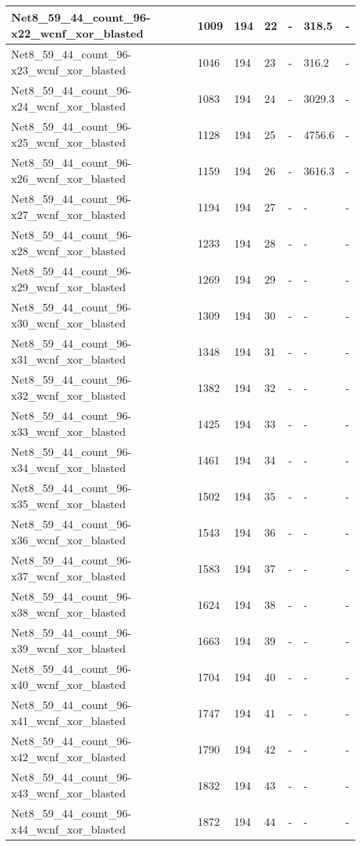 \begin{scriptsize}
\begin{longtable}{|p{5cm}|l|l|l|l|l|l|}
Net8\_59\_44\_count\_96-x22\_wcnf\_xor\_blasted&1009&194&22&-&318.5&- \\ \hline 
Net8\_59\_44\_count\_96-x23\_wcnf\_xor\_blasted&1046&194&23&-&316.2&- \\ \hline 
Net8\_59\_44\_count\_96-x24\_wcnf\_xor\_blasted&1083&194&24&-&3029.3&- \\ \hline 
Net8\_59\_44\_count\_96-x25\_wcnf\_xor\_blasted&1128&194&25&-&4756.6&- \\ \hline 
Net8\_59\_44\_count\_96-x26\_wcnf\_xor\_blasted&1159&194&26&-&3616.3&- \\ \hline 
Net8\_59\_44\_count\_96-x27\_wcnf\_xor\_blasted&1194&194&27&-&-&- \\ \hline 
Net8\_59\_44\_count\_96-x28\_wcnf\_xor\_blasted&1233&194&28&-&-&- \\ \hline 
Net8\_59\_44\_count\_96-x29\_wcnf\_xor\_blasted&1269&194&29&-&-&- \\ \hline 
Net8\_59\_44\_count\_96-x30\_wcnf\_xor\_blasted&1309&194&30&-&-&- \\ \hline 
Net8\_59\_44\_count\_96-x31\_wcnf\_xor\_blasted&1348&194&31&-&-&- \\ \hline 
Net8\_59\_44\_count\_96-x32\_wcnf\_xor\_blasted&1382&194&32&-&-&- \\ \hline 
Net8\_59\_44\_count\_96-x33\_wcnf\_xor\_blasted&1425&194&33&-&-&- \\ \hline 
Net8\_59\_44\_count\_96-x34\_wcnf\_xor\_blasted&1461&194&34&-&-&- \\ \hline 
Net8\_59\_44\_count\_96-x35\_wcnf\_xor\_blasted&1502&194&35&-&-&- \\ \hline 
Net8\_59\_44\_count\_96-x36\_wcnf\_xor\_blasted&1543&194&36&-&-&- \\ \hline 
Net8\_59\_44\_count\_96-x37\_wcnf\_xor\_blasted&1583&194&37&-&-&- \\ \hline 
Net8\_59\_44\_count\_96-x38\_wcnf\_xor\_blasted&1624&194&38&-&-&- \\ \hline 
Net8\_59\_44\_count\_96-x39\_wcnf\_xor\_blasted&1663&194&39&-&-&- \\ \hline 
Net8\_59\_44\_count\_96-x40\_wcnf\_xor\_blasted&1704&194&40&-&-&- \\ \hline 
Net8\_59\_44\_count\_96-x41\_wcnf\_xor\_blasted&1747&194&41&-&-&- \\ \hline 
Net8\_59\_44\_count\_96-x42\_wcnf\_xor\_blasted&1790&194&42&-&-&- \\ \hline 
Net8\_59\_44\_count\_96-x43\_wcnf\_xor\_blasted&1832&194&43&-&-&- \\ \hline 
Net8\_59\_44\_count\_96-x44\_wcnf\_xor\_blasted&1872&194&44&-&-&- \\ \hline 

\end{longtable}
\end{scriptsize}
